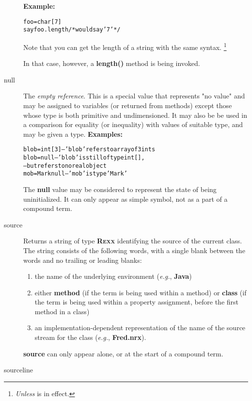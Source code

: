 \begin{description}
\textbf{Example:}
\begin{alltt}
foo=char[7]
say foo.length     /* would say '7' */
\end{alltt}
 
Note that you can get the length of a \nr{} string with the
same syntax.
\footnote{\emph{Unless } is in effect.}

In that case, however, a \textbf{length()} method is being invoked.
\item[null]\label{refswnull}
 
The \emph{empty reference}.  This is a special value that represents
"no value" and may be assigned to variables (or returned from
methods) except those whose type is both primitive and undimensioned.
It may also be be used in a comparison for equality (or inequality) with
values of suitable type, and may be given a type.
 \textbf{Examples:}
\begin{alltt}
blob=int[3]   -- 'blob' refers to array of 3 ints
blob=null     -- 'blob' is still of type int[],
              -- but refers to no real object
mob=Mark null -- 'mob' is type 'Mark'
\end{alltt}
 The \textbf{null} value may be considered to represent the state of
being uninitialized.  It can only appear as simple symbol, not as a part
of a compound term.
\item[source]\label{refswsourc}
 
Returns a string of type \textbf{R\textsc{exx}} identifying the source of the
current class.
The string consists of the following words, with a single blank between
the words and no trailing or leading blanks:
\begin{enumerate}
\item the name of the underlying environment (\emph{e.g.}, \textbf{Java})
\item either \textbf{method} (if the term is being used within a method)
or \textbf{class} (if the term is being used within a property
assignment, before the first method in a class)
\item 
an implementation-dependent representation of the name of the
source stream for the class (\emph{e.g.}, \textbf{Fred.nrx}).
\end{enumerate}
 \textbf{source} can only appear alone, or at the start of a
compound term.
\item[sourceline]\label{refswsourl}
 

\end{description}
